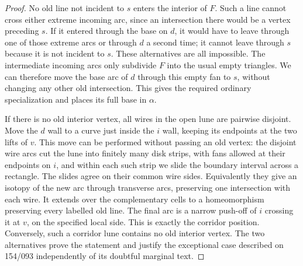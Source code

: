 \begin{proof}
No old line not incident to $s$ enters the interior of $F$.  Such a
line cannot cross either extreme incoming arc, since an intersection
there would be a vertex preceding $s$.  If it entered through the
base on $d$, it would have to leave through one of those extreme
arcs or through $d$ a second time; it cannot leave through $s$
because it is not incident to $s$.  These alternatives are all
impossible.  The intermediate incoming arcs only subdivide $F$
into the usual empty triangles.  We can therefore move the base
arc of $d$ through this empty fan to $s$, without changing any
other old intersection.  This gives the required ordinary
specialization and places its full base in $\alpha$.

If there is no old interior vertex, all wires in the open lune are
pairwise disjoint.  Move the $d$ wall to a curve just inside the
$i$ wall, keeping its endpoints at the two lifts of $v$.  This move
can be performed without passing an old vertex: the disjoint
wire arcs cut the lune into finitely many disk strips, with fans
allowed at their endpoints on $i$, and within each such strip we
slide the boundary interval across a rectangle.  The slides agree
on their common wire sides.  Equivalently they give an isotopy of
the new arc through transverse arcs, preserving one intersection
with each wire.  It extends over the complementary cells to a
homeomorphism preserving every labelled old line.  The final arc
is a narrow push-off of $i$ crossing it at $v$, on the specified
local side.  This is exactly the corridor position.  Conversely,
such a corridor lune contains no old interior vertex.  The two
alternatives prove the statement and justify the exceptional case
described on 154/093 independently of its doubtful marginal text.
\end{proof}

